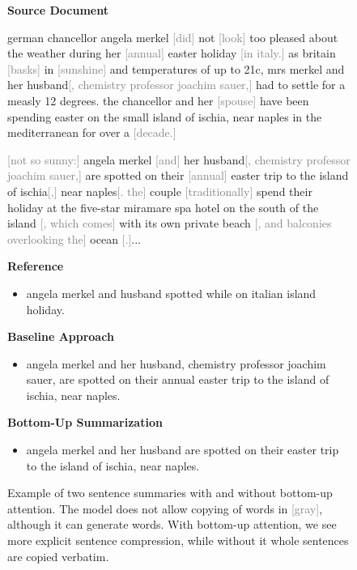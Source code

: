 \documentclass[11pt,a4paper]{article}
\newcommand{\notcopied}[1]{{\textcolor{gray}{[#1]}}}
\newcommand{\squeezeup}{\vspace{-3.5mm}}
\begin{document}
\begin{figure}[t!]
\begin{framed}
\textbf{Source Document}

\small{german chancellor angela merkel \notcopied{did} not \notcopied{look} too pleased about the weather during her \notcopied{annual} easter holiday \notcopied{in italy.} as britain \notcopied{basks} in \notcopied{sunshine} and temperatures of up to 21c, mrs merkel and her husband\notcopied{, chemistry professor joachim sauer,} had to settle for a measly 12 degrees. the chancellor and her \notcopied{spouse} have been spending easter on the small island of ischia, near naples in the mediterranean for over a \notcopied{decade.} 

\notcopied{not so sunny:} angela merkel \notcopied{and} her husband\notcopied{, chemistry professor joachim sauer,} are spotted on their \notcopied{annual} easter trip to the island of ischia\notcopied{,} near naples\notcopied{. the} couple \notcopied{traditionally} spend their holiday at the five-star miramare spa hotel on the south of the island \notcopied{, which comes} with its own private beach \notcopied{, and balconies overlooking the} ocean \notcopied{.}...}

\textbf{Reference}

\small{
\begin{itemize}[align=left, leftmargin=*, noitemsep]
\item angela merkel and husband spotted while on italian island holiday. \\
 
\end{itemize}}

\textbf{Baseline Approach}

\small{
\begin{itemize}[align=left, leftmargin=*, noitemsep]
\item angela merkel and her husband, chemistry professor joachim sauer, are spotted on their annual easter trip to the island of ischia, near naples. \\
 \end{itemize}}

\textbf{Bottom-Up Summarization}

\small{
\begin{itemize}[align=left, leftmargin=*, noitemsep]
\item angela merkel and her husband are spotted on their easter trip to the island of ischia, near naples. 
\\  \end{itemize}
}
\end{framed}
\caption{Example of two sentence summaries with and without bottom-up attention. The model does not allow copying of words in \notcopied{gray}, although it can generate words. With bottom-up attention, we see more explicit sentence compression, while without it whole sentences are copied verbatim.}
\label{fig:ex}
\squeezeup
\end{figure}
\end{document}
